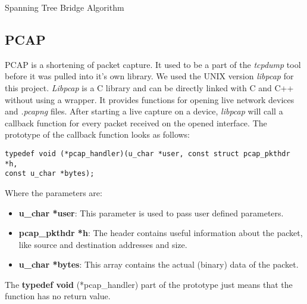\begin{algorithm}[h]
    \DontPrintSemicolon
    \;
    
    \caption{Spanning Tree Bridge Algorithm}
    \label{alg:stp}
\end{algorithm}
\subsection{PCAP}
PCAP is a shortening of packet capture.
It used to be a part of the \textit{tcpdump} tool before it was pulled into it's own library.
We used the UNIX version \textit{libpcap} for this project.
\textit{Libpcap} is a C library and can be directly linked with C and C++ without using a wrapper.
It provides functions for opening live network devices and \textit{.pcapng} files.
After starting a live capture on a device, \textit{libpcap} will call a callback function for every packet received on the opened interface.
The prototype of the callback function looks as follows:
\begin{lstlisting}
typedef void (*pcap_handler)(u_char *user, const struct pcap_pkthdr *h,
const u_char *bytes);
\end{lstlisting}
Where the parameters are:
\begin{itemize}
    \item \textbf{u\_char *user}: This parameter is used to pass user defined parameters.
    \item \textbf{pcap\_pkthdr *h}: The header contains useful information about the packet, like source and destination addresses and size.
    \item \textbf{u\_char *bytes}: This array contains the actual (binary) data of the packet.
\end{itemize}
The \textbf{typedef void} (*pcap\_handler) part of the prototype just means that the function has no return value.

